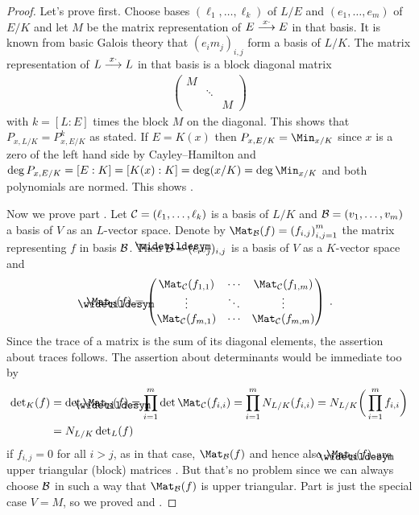 \documentclass[a4paper,parskip=half,numbers=enddot, DIV=12, headheight=30pt]{scrreprt}
\begin{document}
\begin{proof}
		Let's prove  first. Choose bases $(\ell_1,\ldots,\ell_k)$ of $L/E$ and $(e_1,\ldots,e_m)$ of $E/K$ and let $M$ be the matrix representation of $E\morphism[x\cdot] E$ in that basis. It is known from basic Galois theory that $(e_im_j)_{i,j}$ form a basis of $L/K$. The matrix representation of $L\morphism[x\cdot] L$ in that basis is a block diagonal matrix 
		\begin{align*}
			\begin{pmatrix}
				M & & \\
				 & \ddots & \\
				  & & M
			\end{pmatrix}
		\end{align*}
		with $k=[L:E]$ times the block $M$ on the diagonal. This shows that $P_{x,L/K} = P_{x,E/K}^k$ as stated. If $E=K(x)$ then $P_{x,E/K} = \Min_{x/K}$ since $x$ is a zero of the left hand side by Cayley--Hamilton and $\deg P_{x,E/K} = [E:K] = [K(x):K] = \deg(x/K) = \deg \Min_{x/K}$ and both polynomials are normed. This shows .
		
		Now we prove part . Let $\mathcal{C}=(\ell_1,\ldots, \ell_k)$ is a basis of $L/K$ and $\mathcal{B}=(v_1,\ldots,v_m)$ a basis of $V$ as an $L$-vector space. Denote by $\Mat_\Bb(f) =\left(f_{i,j}\right)_{i,j=1}^m$ the matrix representing $f$ in basis $\mathcal{B}$. Then $\snake \Bb= (\ell_iv_j)_{i,j}$ is a basis of $V$ as a $K$-vector space and 
		\begin{align*}
			\Mat_{\snake{\Bb}}(f)=
			\begin{pmatrix}
				\Mat_{\Cc}(f_{1,1}) & \cdots & \Mat_\Cc(f_{1,m}) \\
				\vdots & \ddots & \vdots \\
				\Mat_\Cc(f_{m,1}) & \cdots & \Mat_\Cc(f_{m,m})
			\end{pmatrix}\;.
		\end{align*}		
		Since the trace of a matrix is the sum of its diagonal elements, the assertion about traces follows. The assertion about determinants would be immediate too by
		\begin{align*}
			\det_K(f)&=\det\Mat_{\snake \Bb}(f)=\prod_{i=1}^{m}\det\Mat_\Cc(f_{i,i})=\prod_{i=1}^{m}N_{L/K}(f_{i,i})=N_{L/K}\bigg(\prod_{i=1}^{m}f_{i,i}\bigg)\\
			&=N_{L/K}\det_L(f)
		\end{align*}
		if $f_{i,j}=0$ for all $i>j$, as in that case, $\Mat_\Bb(f)$ and hence also $\Mat_{\snake \Bb}(f)$ are upper triangular (block) matrices . But that's no problem since we can always choose $\mathcal{B}$ in such a way that $\Mat_\Bb(f)$ is upper triangular. Part  is just the special case $V=M$, so we proved  and .
		

\end{proof}
\end{document}
